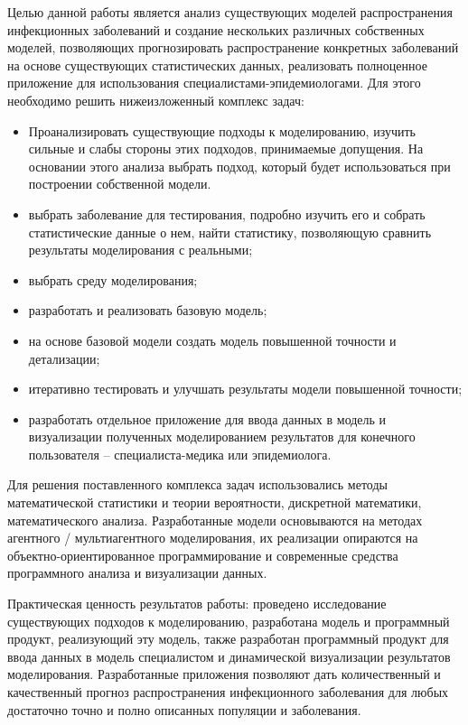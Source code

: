 Целью данной работы является анализ существующих моделей распространения инфекционных заболеваний и  создание нескольких различных собственных моделей, позволяющих прогнозировать распространение конкретных заболеваний на основе существующих статистических данных, реализовать полноценное приложение для использования \newline специалистами-эпидемиологами.  Для этого необходимо решить нижеизложенный комплекс задач:
\begin{itemize}
	\item Проанализировать существующие подходы к моделированию, изучить сильные и слабы стороны этих подходов, принимаемые допущения. На основании этого анализа выбрать подход, который будет использоваться при построении собственной модели.
	
	\item выбрать заболевание для тестирования, подробно изучить его и собрать статистические данные о нем, найти статистику, позволяющую сравнить результаты моделирования с реальными;
	
	\item выбрать среду моделирования;
	
	\item разработать и реализовать базовую модель;
	
	\item на основе базовой модели создать модель повышенной точности и детализации;
	
	\item итеративно тестировать и улучшать результаты модели повышенной точности; 
	
	\item разработать отдельное приложение для ввода данных в модель и визуализации полученных моделированием результатов для конечного пользователя -- специалиста-медика или эпидемиолога. 	
\end{itemize}

Для решения поставленного комплекса задач использовались методы математической статистики и теории вероятности, дискретной математики, математического анализа. Разработанные модели основываются на методах агентного / мультиагентного моделирования, их реализации опираются на объектно-ориентированное программирование и современные средства  программного анализа и визуализации данных. 

Практическая ценность результатов работы: проведено исследование существующих подходов к моделированию,	разработана модель  и программный продукт, реализующий эту модель, также разработан программный продукт для ввода данных в модель специалистом и динамической визуализации результатов моделирования. Разработанные приложения позволяют дать количественный и качественный прогноз распространения инфекционного заболевания для любых  достаточно точно и полно описанных популяции и заболевания.
